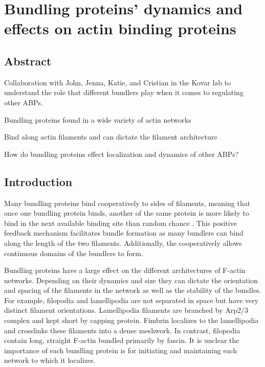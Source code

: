 \chapter{Bundling proteins' dynamics and effects on actin binding proteins}\label{ch:abp-bundle}

\section[Abstract]{Abstract\footnotemark}

Collaboration with John, Jenna, Katie, and Cristian in the Kovar lab to understand the role that different bundlers play when it comes to regulating other ABPs.

Bundling proteins found in a wide variety of actin networks

Bind along actin filaments and can dictate the filament architecture

How do bundling proteins effect localization and dynamics of other ABPs?


\section{Introduction}\label{ch03-introduction}

Many bundling proteins bind cooperatively to sides of filaments, 
meaning that once one bundling protein binds, another of the same 
protein is more likely to bind in the next available binding site 
than random chance \citep{winkelman_fascin-_2016}. This positive 
feedback mechanism facilitates bundle formation as many bundlers can
bind along the length of the two filaments. Additionally, the 
cooperatively allows continuous domains of the bundlers to form.

Bundling proteins have a large effect on the different architectures of 
F-actin networks. Depending on their dynamics and size they can dictate 
the orientation and spacing of the filaments in the network as well as 
the stability of the bundles. For example, filopodia and lamellipodia 
are not separated in space but have very distinct filament orientations. Lamellipodia filaments are branched by Arp2/3 complex and kept short by
capping protein. Fimbrin localizes to the lamellipodia and crosslinks 
these filaments into a dense meshwork. In contrast, filopodia contain long, straight F-actin bundled primarily by fascin.  It is unclear the importance
of each bundling protein is for initiating and maintaining each network
to which it localizes. 

